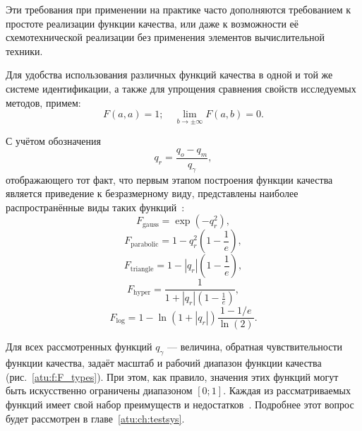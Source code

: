 Эти требования при применении на практике часто дополняются
требованием к простоте реализации функции качества,
или даже к возможности её схемотехнической реализации
без применения элементов вычислительной техники.

Для удобства использования различных функций качества
в одной и той же системе идентификации, а также для
упрощения сравнения свойств исследуемых методов,
примем:
\begin{equation}
  F(a,a) = 1;
  \quad
  \lim\limits_{b \to \pm \infty } F(a,b) = 0.
  \label{atu:eq:F_scale}
\end{equation}




С учётом обозначения
\begin{equation}
  q_r = \frac{q_o - q_m}{q_\gamma},
\label{atu:eq:q_r}
\end{equation}
%
\noindent
отображающего тот факт, что первым этапом построения функции качества
является приведение к безразмерному виду,
представлены наиболее распространённые виды таких функций~\cite{atu_ISDMCI2016,atu_asau24}:
%
\begin{equation}
  F_{\mathrm{gauss}} = \exp( - q_r^2 ),
\label{atu:eq:F_gauss}
\end{equation}
%
\begin{equation}
  F_{\mathrm{parabolic}} = 1 - q_r^2 \left( 1 - \frac{1}{e} \right),
\label{atu:eq:F_parabolic}
\end{equation}
%
\begin{equation}
  F_{\mathrm{triangle}} = 1 - |q_r| \left( 1 - \frac{1}{e} \right),
\label{atu:eq:F_triangle}
\end{equation}
%
\begin{equation}
  F_{\mathrm{hyper}} = \frac{1}{ 1 + |q_r| \left( 1 - \frac{1}{e} \right)},
\label{atu:eq:F_hyper}
\end{equation}
%
\begin{equation}
  F_{\mathrm{log}} = 1 - \ln \left( 1 + |q_r| \right) \frac{1-1/e}{\ln(2)}.
\label{atu:eq:F_log}
\end{equation}

Для всех рассмотренных функций $q_\gamma$ --- величина, обратная чувствительности
функции качества, задаёт масштаб и рабочий диапазон функции качества (рис.~\ref{atu:f:F_types}).
При этом, как правило, значения этих функций могут быть искусственно ограничены диапазоном $[0;1]$.
Каждая из рассматриваемых функций имеет свой набор преимуществ и недостатков~\cite{atu_ISDMCI2016}.
Подробнее этот вопрос будет рассмотрен в главе~\ref{atu:ch:testsys}.

